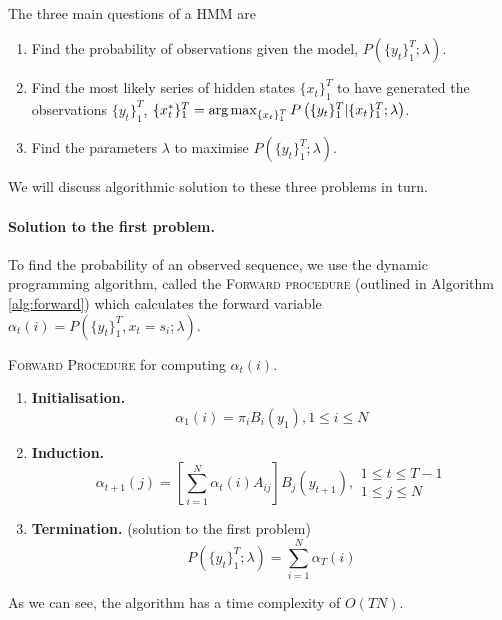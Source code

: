 \paragraph{}
	The three main questions of a HMM are
	\begin{enumerate}
		\item Find the probability of observations given the model, $P\left(\{y_t\}_1^T; \lambda\right)$.
		\item Find the most likely series of hidden states $\{x_t\}_1^T$ to have generated the observations $\{y_t\}_1^T$, $\{x_t^\ast\}_1^T = \operatorname*{arg\,max}_{\{x_t\}_1^T} P\left(\{y_t\}_1^T | \{x_t\}_1^T; \lambda\right)$.
		\item Find the parameters $\lambda$ to maximise $P\left(\{y_t\}_1^T; \lambda\right)$.
	\end{enumerate}
We will discuss algorithmic solution to these three problems in turn.

\paragraph{Solution to the first problem.} To find the probability of an observed sequence, we use the dynamic programming algorithm, called the \textsc{Forward procedure} (outlined in Algorithm \ref{alg:forward}) which calculates the forward variable $\alpha_t (i) = P(\{y_t\}_1^T, x_t = s_i; \lambda)$.
\begin{algorithm}
	\caption{\textsc{Forward Procedure} for computing $\alpha_t(i)$.}
	\label{alg:forward}
	\begin{enumerate}
		\item
			\textbf{Initialisation.}
			$$\alpha_1(i) = \pi_i B_i(y_1), 1 \leq i \leq N$$
		\item
			\textbf{Induction.}
			\begin{equation*}
				\alpha_{t + 1}(j) = \left[ \sum_{i = 1}^N \alpha_t(i) A_{ij} \right] B_j (y_{t + 1}), 
				\begin{array}{lr}
					1 \leq t \leq T - 1\\
					1 \leq j \leq N
				\end{array}
			\end{equation*}
			
		\item
			\textbf{Termination.} (solution to the first problem)
			$$P\left(\{y_t\}_1^T; \lambda\right) = \sum_{i = 1}^N \alpha_T(i)$$
	\end{enumerate}
\end{algorithm}
As we can see, the algorithm has a time complexity of $O(TN)$.

